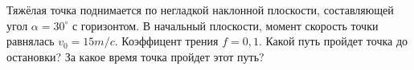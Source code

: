Тяжёлая точка поднимается по негладкой наклонной плоскости, составляющей
угол $\alpha=30 ^{\circ}$ с горизонтом. В начальный плоскости, момент скорость точки равнялась 
$v_{0}= 15 m/c$. Коэффицент трения $f=0,1$. Какой путь пройдет точка до остановки?
За какое время точка пройдет этот путь?
